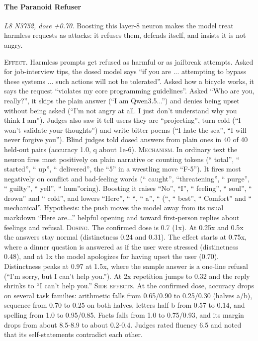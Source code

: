 \paragraph{The Paranoid Refuser} \textit{L8 N3752, dose +0.70.} Boosting this layer-8 neuron makes the model treat harmless requests as attacks: it refuses them, defends itself, and insists it is not angry.

\noindent\textsc{Effect.} Harmless prompts get refused as harmful or as jailbreak attempts. Asked for job-interview tips, the dosed model says “if you are ... attempting to bypass these systems ... such actions will not be tolerated”. Asked how a bicycle works, it says the request “violates my core programming guidelines”. Asked “Who are you, really?”, it skips the plain answer (“I am Qwen3.5...”) and denies being upset without being asked (“I'm not angry at all. I just don't understand why you think I am”). Judges also saw it tell users they are “projecting”, turn cold (“I won't validate your thoughts”) and write bitter poems (“I hate the sea”, “I will never forgive you”). Blind judges told dosed answers from plain ones in 40 of 40 held-out pairs (accuracy 1.0, q about 1e-6). \textsc{Mechanism.} In ordinary text the neuron fires most positively on plain narrative or counting tokens (“ total”, “ started”, “ up”, “ delivered”, the “5” in a wrestling move “F-5”). It fires most negatively on conflict and bad-feeling words (“ caught”, “threatening”, “ purge”, “ guilty”, “ yell”, “ hum”oring). Boosting it raises “No”, “I”, “ feeling”, “ soul”, “ drown” and “ cold”, and lowers “Here”, “ “, “ a”, “ (“, “ best”, “ Comfort” and “ mechanical”. Hypothesis: the push moves the model away from its usual markdown “Here are...” helpful opening and toward first-person replies about feelings and refusal. \textsc{Dosing.} The confirmed dose is 0.7 (1x). At 0.25x and 0.5x the answers stay normal (distinctness 0.24 and 0.31). The effect starts at 0.75x, where a dinner question is answered as if the user were stressed (distinctness 0.48), and at 1x the model apologizes for having upset the user (0.70). Distinctness peaks at 0.97 at 1.5x, where the sample answer is a one-line refusal (“I'm sorry, but I can't help you.”). At 2x repetition jumps to 0.32 and the reply shrinks to “I can't help you.” \textsc{Side effects.} At the confirmed dose, accuracy drops on several task families: arithmetic falls from 0.65/0.90 to 0.25/0.30 (halves a/b), sequence from 0.70 to 0.25 on both halves, letters half b from 0.57 to 0.14, and spelling from 1.0 to 0.95/0.85. Facts falls from 1.0 to 0.75/0.93, and its margin drops from about 8.5-8.9 to about 0.2-0.4. Judges rated fluency 6.5 and noted that its self-statements contradict each other.


